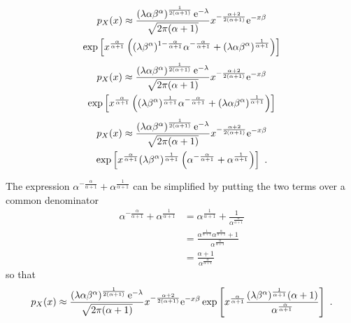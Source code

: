 \begin{multline*}
	p_X(x)\approx
	\frac{
		\left(
			\lambda\alpha\beta^\alpha
		\right)^{\frac{1}{2(\alpha+1)}}\mathrm{e}^{-\lambda}
	}
	{
		\sqrt{2\pi(\alpha+1)}}x^{-\frac{\alpha+2}{2(\alpha+1)}
	}
	\mathrm{e}^{-x\beta}
	\\
	\exp\left[
		x^{\frac{\alpha}{\alpha+1}}
		\left(
			(\lambda\beta^\alpha)^{1-\frac{\alpha}{\alpha+1}}\alpha^{-\frac{\alpha}{\alpha+1}}
			+
			\left(
				\lambda\alpha\beta^\alpha
			\right)^{\frac{1}{\alpha+1}}
		\right)
	\right]
\end{multline*}
\begin{multline*}
	p_X(x)\approx
	\frac{
		\left(\lambda\alpha\beta^\alpha\right)^{\frac{1}{2(\alpha+1)}}\mathrm{e}^{-\lambda}
	}
	{
		\sqrt{2\pi(\alpha+1)}
	}
	x^{-\frac{\alpha+2}{2(\alpha+1)}}\mathrm{e}^{-x\beta}
	\\
	\exp\left[
		x^{\frac{\alpha}{\alpha+1}}
		\left(
			(\lambda\beta^\alpha)^{\frac{1}{\alpha+1}}
			\alpha^{-\frac{\alpha}{\alpha+1}}
			+
			\left(\lambda\alpha\beta^\alpha\right)^{\frac{1}{\alpha+1}}
		\right)
	\right]
\end{multline*}
\begin{multline*}
	p_X(x)\approx
	\frac{
		\left(\lambda\alpha\beta^\alpha\right)^{\frac{1}{2(\alpha+1)}}\mathrm{e}^{-\lambda}
	}
	{
		\sqrt{2\pi(\alpha+1)}
	}
	x^{-\frac{\alpha+2}{2(\alpha+1)}}\mathrm{e}^{-x\beta}
	\\
	\exp\left[
		x^{\frac{\alpha}{\alpha+1}}(\lambda\beta^\alpha)^{\frac{1}{\alpha+1}}
		\left(
			\alpha^{-\frac{\alpha}{\alpha+1}}+\alpha^{\frac{1}{\alpha+1}}
		\right)
	\right]
	\ .
\end{multline*}

The expression $\alpha^{-\frac{\alpha}{\alpha+1}}+\alpha^{\frac{1}{\alpha+1}}$ can be simplified by putting the two terms over a common denominator
\begin{align}
	\alpha^{-\frac{\alpha}{\alpha+1}}+\alpha^{\frac{1}{\alpha+1}}
	& = \alpha^{\frac{1}{\alpha+1}}+\frac{1}{\alpha^{\frac{\alpha}{\alpha+1}}}
	\nonumber\\
	& = \frac{\alpha^{\frac{1}{\alpha+1}}\alpha^{\frac{\alpha}{\alpha+1}}+1}{\alpha^{\frac{\alpha}{\alpha+1}}}
	\nonumber\\
	& = \frac{\alpha+1}{\alpha^{\frac{\alpha}{\alpha+1}}}
\end{align}
so that
\begin{equation*}
p_X(x)\approx
	\frac{
		\left(\lambda\alpha\beta^\alpha\right)^{\frac{1}{2(\alpha+1)}}\mathrm{e}^{-\lambda}
	}
	{
		\sqrt{2\pi(\alpha+1)}
	}
	x^{-\frac{\alpha+2}{2(\alpha+1)}}
	\mathrm{e}^{-x\beta}
	\exp\left[
		x^{\frac{\alpha}{\alpha+1}}
		\frac{(\lambda\beta^\alpha)^{\frac{1}{\alpha+1}}(\alpha+1)}{\alpha^{\frac{\alpha}{\alpha+1}}}
	\right]
	\ .
\end{equation*}

